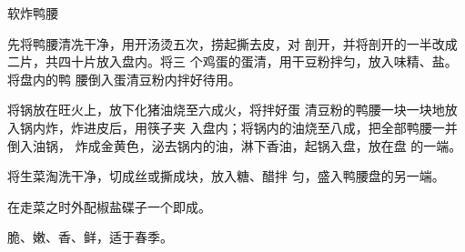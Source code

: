 \begin{recipe}{软炸鸭腰}

\ingredients


\cooking

\step 	先将鸭腰清冼干净，用开汤烫五次，捞起撕去皮，对 剖开，并将剖开的一半改成二片，共四十片放入盘内。将三 个鸡蛋的蛋清，用干豆粉拌匀，放入味精、盐。将盘内的鸭 腰倒入蛋清豆粉内拌好待用。

\step 	将锅放在旺火上，放下化猪油烧至六成火，将拌好蛋 清豆粉的鸭腰一块一块地放入锅内炸，炸进皮后，用筷子夹 入盘内；将锅内的油烧至八成，把全部鸭腰一并倒入油锅， 炸成金黄色，泌去锅内的油，淋下香油，起锅入盘，放在盘 的一端。

\step 	将生菜淘洗干净，切成丝或撕成块，放入糖、醋拌 匀，盛入鸭腰盘的另一端。

\step 	在走菜之时外配椒盐碟子一个即成。

\notes

脆、嫩、香、鲜，适于春季。

\end{recipe}

